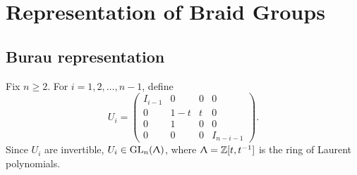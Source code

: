 \section{Representation of Braid Groups}
\label{Burau}

\subsection{Burau representation}

  Fix $n\geq 2$. For $i=1,2,\ldots, n-1$, define 
\begin{displaymath}
  U_i = \begin{pmatrix} I_{i-1} & 0 & 0 & 0 \\
    0 & 1-t & t & 0 \\
    0 & 1 & 0 & 0 \\
  0 & 0 & 0 & I_{n-i-1}\end{pmatrix}.
\end{displaymath}
  Since $U_i$ are invertible, $U_i \in \text{GL}_n(\Uplambda)$, where $\Uplambda = \mathbb{Z}[t, t^{-1}]$ is the ring of Laurent polynomials.

